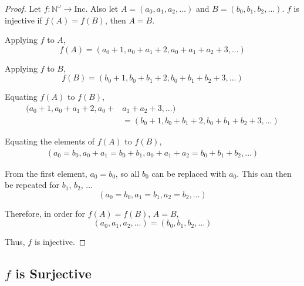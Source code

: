 \documentclass{article}
\begin{document}
\begin{proof}
  Let $f: \mathbb{N}^{\omega} \rightarrow \mathrm{Inc}$. Also let $A = (a_{0},
  a_{1}, a_{2}, \ldots)$ and $B = (b_{0}, b_{1}, b_{2}, \ldots)$. $f$ is
  injective if $f(A) = f(B)$, then $A = B$.

  \bigbreak

  Applying $f$ to $A$,
  $$ f(A) = (a_{0} + 1, a_{0} + a_{1} + 2, a_{0} + a_{1} + a_{2} + 3, ...) $$

  Applying $f$ to $B$,
  $$ f(B) = (b_{0} + 1, b_{0} + b_{1} + 2, b_{0} + b_{1} + b_{2} + 3, ...) $$

  Equating $f(A)$ to $f(B)$,
  \begin{equation*}
    \begin{split}
      (a_{0} + 1, a_{0} + a_{1} + 2, a_{0} + &a_{1} + a_{2} + 3, ...) \\
      & = (b_{0} + 1, b_{0} + b_{1} + 2, b_{0} + b_{1} + b_{2} + 3, ...)
    \end{split}
  \end{equation*}

  Equating the elements of $f(A)$ to $f(B)$,
  \begin{equation*}
    \begin{split}
      (a_{0} = b_{0}, a_{0} + a_{1} = b_{0} + b_{1}, a_{0} + a_{1} + a_{2} =
      b_{0} + b_{1} + b_{2}, ...)
    \end{split}
  \end{equation*}

  From the first element, $a_{0} = b_{0}$, so all $b_{0}$ can be replaced with
  $a_{0}$. This can then be repeated for $b_{1}$, $b_{2}$, $\ldots$
  $$ (a_{0} = b_{0}, a_{1} = b_{1}, a_{2} = b_{2}, \ldots) $$

  Therefore, in order for $f(A) = f(B)$, $A = B$,
  $$ (a_{0}, a_{1}, a_{2}, \ldots) = (b_{0}, b_{1}, b_{2}, \ldots) $$

  Thus, $f$ is injective.
\end{proof}

\subsection*{$f$ is Surjective}
\end{document}
